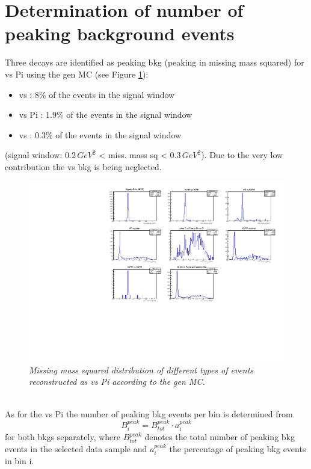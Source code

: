 \section{Determination of number of peaking background events}
\label{sec:klpeak}
Three decays are identified as peaking bkg (peaking in missing mass squared) for \KlPiPi vs \4Pi using the gen MC (see Figure \ref{fig:missmasssq}):
\begin{itemize}
\item \KlPiPi vs \KsPiPi : 8\% of the events in the signal window
\item \KsPiPi vs \4Pi : 1.9\% of the events in the signal window
\item \KsPiPi vs \KsPiPi : 0.3\% of the events in the signal window
\end{itemize}
(signal window: $0.2\, GeV^2$ < miss. mass sq < $0.3\, GeV^2$). Due to the very low contribution the \KsPiPi vs \KsPiPi bkg is being neglected.\\
\begin{figure}[!h]
	\vspace*{-0.cm}
	\begin{center}
		\includegraphics[width=1.\textwidth]{missmasssq.pdf}
		\vspace*{-1.5cm}
	\end{center}
	\caption{\textit{Missing mass squared distribution of different types of events reconstructed as  \KlPiPi vs \4Pi according to the gen MC.}}
	\label{fig:missmasssq}
\end{figure}\\
As for the \KsPiPi vs \4Pi the number of peaking bkg events per bin is determined from
\begin{equation}
B_i^{peak} = B_{tot}^{peak} \cdot a_i^{peak}
\end{equation}
for both bkgs separately, where $B_{tot}^{peak}$ denotes the total number of peaking bkg events in the selected data sample and $a_i^{peak}$ the percentage of peaking bkg  events in bin i.\\

